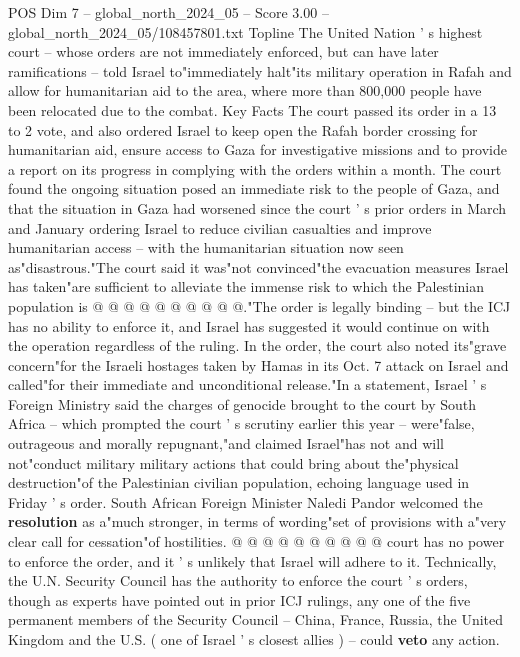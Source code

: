 \begin{textsample}{POS Dim 7 – global\_north\_2024\_05 – Score 3.00 – global\_north\_2024\_05/108457801.txt}  \label{ex:f7_pos_266}
Topline The United Nation ' s highest court -- whose orders are not immediately enforced, but can have later ramifications -- told Israel to"immediately halt"its military operation in Rafah and allow for humanitarian aid to the area, where more than 800,000 people have been relocated due to the combat.
Key Facts The court passed its order in a 13 to 2 vote, and also ordered Israel to keep open the Rafah border crossing for humanitarian aid, ensure access to Gaza for investigative missions and to provide a report on its progress in complying with the orders within a month.
The court found the ongoing situation posed an immediate risk to the people of Gaza, and that the situation in Gaza had worsened since the court ' s prior orders in March and January ordering Israel to reduce civilian casualties and improve humanitarian access -- with the humanitarian situation now seen as"disastrous."The court said it was"not convinced"the evacuation measures Israel has taken"are sufficient to alleviate the immense risk to which the Palestinian population is @ @ @ @ @ @ @ @ @ @."The order is legally binding -- but the ICJ has no ability to enforce it, and Israel has suggested it would continue on with the operation regardless of the ruling.
In the order, the court also noted its"grave concern"for the Israeli hostages taken by Hamas in its Oct. 7 attack on Israel and called"for their immediate and unconditional release."In a statement, Israel ' s Foreign Ministry said the charges of genocide brought to the court by South Africa -- which prompted the court ' s scrutiny earlier this year -- were"false, outrageous and morally repugnant,"and claimed Israel"has not and will not"conduct military military actions that could bring about the"physical destruction"of the Palestinian civilian population, echoing language used in Friday ' s order.
South African Foreign Minister Naledi Pandor welcomed the \textbf{resolution} as a"much stronger, in terms of wording"set of provisions with a"very clear call for cessation"of hostilities. @ @ @ @ @ @ @ @ @ @ court has no power to enforce the order, and it ' s unlikely that Israel will adhere to it.
Technically, the U.N.
Security Council has the authority to enforce the court ' s orders, though as experts have pointed out in prior ICJ rulings, any one of the five permanent members of the Security Council -- China, France, Russia, the United Kingdom and the U.S. ( one of Israel ' s closest allies ) -- could \textbf{veto} any action.

\end{textsample}
